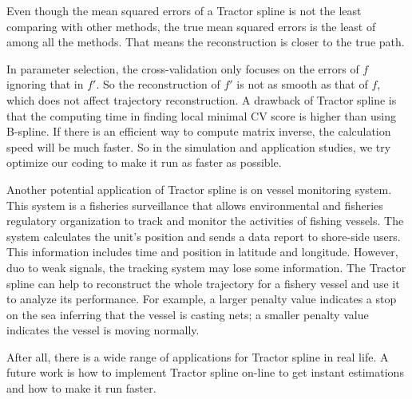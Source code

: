Even though the mean squared errors of a Tractor spline is not the least comparing with other methods, the true mean squared errors is the least of among all the methods. That means the reconstruction is closer to the true path. 


In parameter selection, the cross-validation only focuses on the errors of $f$ ignoring that in $f'$. So the reconstruction of $f'$ is not as smooth as that of $f$, which does not affect trajectory reconstruction. A drawback of Tractor spline is that the computing time in finding local minimal CV score is higher than using B-spline. If there is an efficient way to compute matrix inverse, the calculation speed will be much faster. So in the simulation and application studies, we try optimize our coding to make it run as faster as possible.


Another potential application of Tractor spline is on vessel monitoring system. This system is a fisheries surveillance that allows environmental and fisheries regulatory organization to track and monitor the activities of fishing vessels. The system calculates the unit's position and sends a data report to shore-side users. This information includes time and position in latitude and longitude. However, duo to weak signals, the tracking system may lose some information. The Tractor spline can help to reconstruct the whole trajectory for a fishery vessel and use it to analyze its performance. For example, a larger penalty value indicates a stop on the sea inferring that the vessel is casting nets; a smaller penalty value indicates the vessel is moving normally. 


After all, there is a wide range of applications for Tractor spline in real life. A future work is how to implement Tractor spline on-line to get instant estimations and how to make it run faster. 




